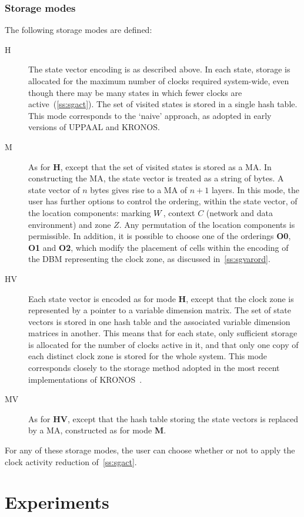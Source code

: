 \subsubsection{Storage modes}
The following storage modes are defined:
\begin{description}
\item[H] The state vector encoding is as described above.
In each state, storage is allocated for the maximum number of clocks
required system-wide, even though there may be many states in which
fewer clocks are active~(\Sec\ref{ss:sgact}). The set of visited states is
stored in a single hash table. This mode corresponds to the `naive' approach,
as adopted in early versions of UPPAAL and KRONOS.
\item[M] As for {\bfseries H}, except that the set of visited states is
stored as a MA. In constructing the MA, the state vector is treated as
a string of bytes. A state vector of $n$ bytes gives rise to a MA of
$n+1$ layers. In this mode, the user has further options to control
the ordering, within the state vector, of the location components:
marking $W$, context $C$ (network and data environment) and zone
$Z$. Any permutation of the location components is permissible. In
addition, it is possible to choose one of the
orderings {\bf O0}, {\bf O1} and {\bf O2}, which modify the placement
of cells within the encoding of the DBM representing the clock zone,
as discussed in~\Sec\ref{ss:sgvarord}.
\item[HV] Each state vector is encoded as for mode {\bfseries H}, 
except that the clock zone is represented by a pointer to a variable
dimension matrix.  The set of state vectors is stored in one hash
table and the associated variable dimension matrices in another. This
means that for each state, only sufficient storage is allocated for
the number of clocks active in it, and that only one copy of each
distinct clock zone is stored for the whole system. This mode
corresponds closely to the storage method adopted in the most recent
implementations of KRONOS~\cite{tri:98}.
\item[MV] As for {\bfseries HV}, except that the hash table storing the
state vectors is replaced by a MA, constructed as for mode {\bf M}.
\end{description}

For any of these storage modes, the user can choose whether or not to
apply the clock activity reduction of~\Sec\ref{ss:sgact}.

\section{Experiments\label{sec:sgexperiments}}
